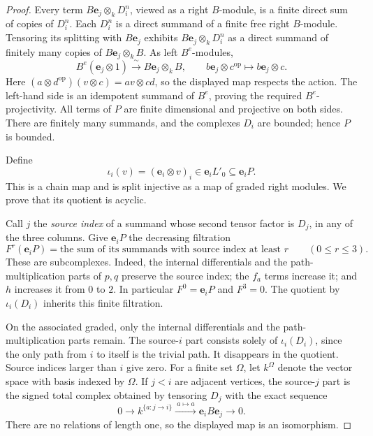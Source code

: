 \documentclass[11pt]{article}
\numberwithin{equation}{section}
\theoremstyle{definition}
\theoremstyle{remark}
\begin{document}
\begin{proof}
Every term \(B\mathbf e_j\otimes_k D_i^n\), viewed as a right
\(B\)-module, is a finite direct sum of copies of \(D_i^n\).
Each $D_i^n$ is a direct summand of a finite free right $B$-module.
Tensoring its splitting with $B\mathbf e_j$ exhibits
$B\mathbf e_j\otimes_kD_i^n$ as a direct summand of finitely many
copies of $B\mathbf e_j\otimes_kB$. As left $B^e$-modules,
\[
 B^e(\mathbf e_j\otimes1)
 \xrightarrow{\ \sim\ }B\mathbf e_j\otimes_kB,
 \qquad b\mathbf e_j\otimes c^{\mathrm{op}}
 \longmapsto b\mathbf e_j\otimes c.
\]
Here $(a\otimes d^{\mathrm{op}})(v\otimes c)=av\otimes cd$,
so the displayed map respects the action. The left-hand side is an
idempotent summand of $B^e$, proving the required $B^e$-projectivity. All terms of $P$ are
finite dimensional and projective on both sides.  There are finitely many summands, and the complexes
\(D_i\) are bounded; hence \(P\) is bounded.

Define
\[
 \iota_i(v)=(\mathbf e_i\otimes v)_i
       \in \mathbf e_iL'_0\subseteq \mathbf e_iP .
\]
This is a chain map and is split injective as a map of graded right
modules.  We prove that its quotient is acyclic.

Call \(j\) the \emph{source index} of a summand whose second tensor
factor is \(D_j\), in any of the three columns.  Give
\(\mathbf e_iP\) the decreasing filtration
\[
 F^r(\mathbf e_iP)
  =\text{the sum of its summands with source index at least }r
  \qquad (0\leq r\leq 3).
\]
These are subcomplexes.  Indeed, the internal differentials and the
path-multiplication parts of \(p,q\) preserve the source index;
the \(f_a\) terms increase it; and \(h\) increases it from \(0\)
to \(2\).  In particular \(F^0=\mathbf e_iP\) and \(F^3=0\).
The quotient by \(\iota_i(D_i)\) inherits this finite filtration.

On the associated graded, only the internal differentials and the
path-multiplication parts remain.  The source-\(i\) part consists
solely of \(\iota_i(D_i)\), since the only path from \(i\) to itself
is the trivial path.  It disappears in the quotient.  Source indices
larger than \(i\) give zero. For a finite set $\Omega$, let
$k^{\Omega}$ denote the vector space with basis indexed by $\Omega$.
If \(j<i\) are adjacent vertices, the
source-\(j\) part is the signed total complex obtained by tensoring
\(D_j\) with the exact sequence
\[
 0\longrightarrow
 k^{\{a:j\to i\}}
 \xrightarrow{\ a\mapsto a\ }
 \mathbf e_iB\mathbf e_j
 \longrightarrow 0.
\]
There are no relations of length one, so the displayed map is an
isomorphism.


\end{proof}
\end{document}

